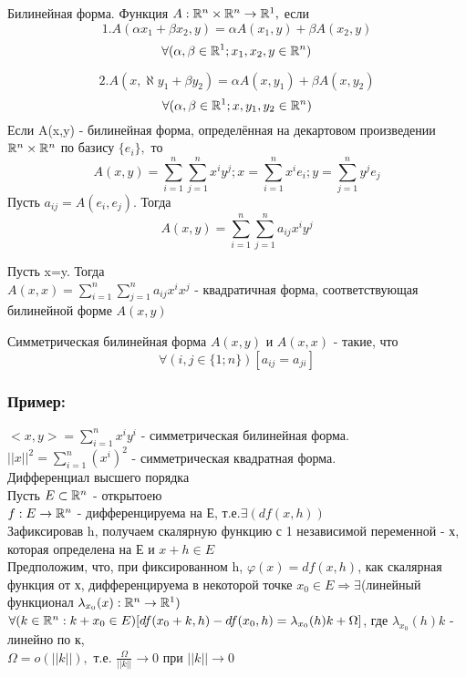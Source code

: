 \begin{opred}
Билинейная форма. Функция $A:\mathbb{R}^n\times\mathbb{R}^n\to\mathbb{R}^1,$ если
\\
$$1.A(\alpha x_1+\beta x_2,y)=\alpha A(x_1,y)+\beta A(x_2,y)$$
$$
\forall(\alpha,\beta\in\mathbb{R}^1; x_1,x_2,y\in\mathbb{R}^n)
$$

$$
2.A(x,\aleph y_1 +\beta y_2) = \alpha A(x,y_1)+\beta A(x,y_2)
$$
$$
\forall(\alpha,\beta\in\mathbb{R}^1; x,y_1,y_2\in\mathbb{R}^n)
$$
Если A(x,y) - билинейная форма, определённая на декартовом произведении $\mathbb{R}^n\times\mathbb{R}^n$ по базису $\{e_i\},$ то
$$
A(x,y) = \sum_{i=1}^{n}\sum_{j=1}^{n}x^i y^j ; x=\sum_{i=1}^{n}x^i e_i; y=\sum_{j=1}^{n} y^j e_j
$$
Пусть $a_{ij}=A(e_i,e_j).$ Тогда
$$
A(x,y) = \sum_{i=1}^{n}\sum_{j=1}^{n} a_{ij}x^i y^j
$$
\end{opred}

\begin{opred}
Пусть x=y. Тогда\\
$A(x,x) = \sum_{i=1}^{n}\sum_{j=1}^{n} a_{ij} x^i x^j$ - квадратичная форма, соответствующая билинейной форме $A(x,y)$
\end{opred}

\begin{opred}
Симметрическая билинейная форма $A(x,y)$ и $A(x,x)$ - такие, что
$$
\forall(i,j\in\{1;n\})[a_{ij}=a_{ji}]
$$
\end{opred}

\subsubsection{Пример:}
$<x,y> = \sum_{i=1}^{n}x^i y^i$ - симметрическая билинейная форма.
\\
$||x||^2 = \sum_{i=1}^{n}(x^i)^2$ - симметрическая квадратная форма.
\\
Дифференциал высшего порядка
\\
Пусть $E\subset\mathbb{R}^n$ - открытоею
\\
$f:E\to\mathbb{R}^n$ - дифференцируема на Е, т.е.$\exists(df(x,h))$
\\
Зафиксировав h, получаем скалярную функцию с 1 независимой переменной - х, которая определена на Е и $x+h\in E$
\\
Предположим, что, при фиксированном h, $\varphi(x)=df(x,h)$, как скалярная функция от х, дифференцируема в некоторой точке $x_0\in E\Rightarrow \exists$(линейный функционал $\lambda_{x_0}(x):\mathbb{R}^n\to\mathbb{R}^1)$
\\
$\forall(k\in\mathbb{R}^n:k+x_0\in E)[df(x_0+k,h)-df(x_0,h)=\lambda_{x_0}(h)k+\Omega]$, где $\lambda_{x_0}(h)k$ - линейно по к,
\\
$\Omega = o(||k||), $ т.е. $\frac{\Omega}{||k||}\to 0$ при $||k||\to 0$

